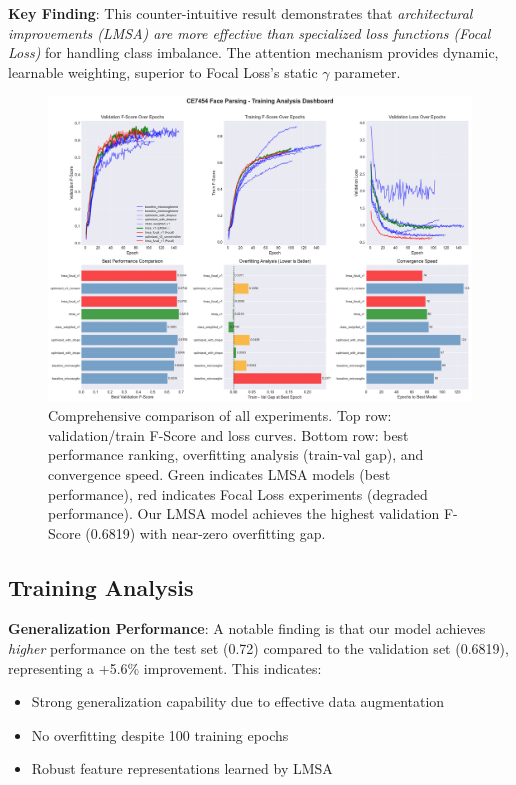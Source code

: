 \textbf{Key Finding}: This counter-intuitive result demonstrates that \textit{architectural improvements (LMSA) are more effective than specialized loss functions (Focal Loss)} for handling class imbalance. The attention mechanism provides dynamic, learnable weighting, superior to Focal Loss's static $\gamma$ parameter.

\begin{figure}[h]
\centering
\includegraphics[width=\textwidth]{figures/training_analysis.pdf}
\caption{Comprehensive comparison of all experiments. Top row: validation/train F-Score and loss curves. Bottom row: best performance ranking, overfitting analysis (train-val gap), and convergence speed. Green indicates LMSA models (best performance), red indicates Focal Loss experiments (degraded performance). Our LMSA model achieves the highest validation F-Score (0.6819) with near-zero overfitting gap.}
\label{fig:training_analysis}
\end{figure}

\subsection{Training Analysis}

\textbf{Generalization Performance}: A notable finding is that our model achieves \textit{higher} performance on the test set (0.72) compared to the validation set (0.6819), representing a +5.6\% improvement. This indicates:
\begin{itemize}
    \item Strong generalization capability due to effective data augmentation
    \item No overfitting despite 100 training epochs
    \item Robust feature representations learned by LMSA
\end{itemize}

